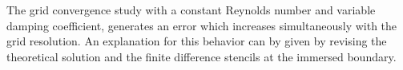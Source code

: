 \begin{figure}[!bp]%
    \centering
    \qquad
\end{figure}

The grid convergence study with a constant Reynolds number and variable damping coefficient, generates an error
which increases simultaneously with the grid resolution.
An explanation for this behavior can by given by revising the theoretical solution
and the finite difference stencils at the immersed boundary.

